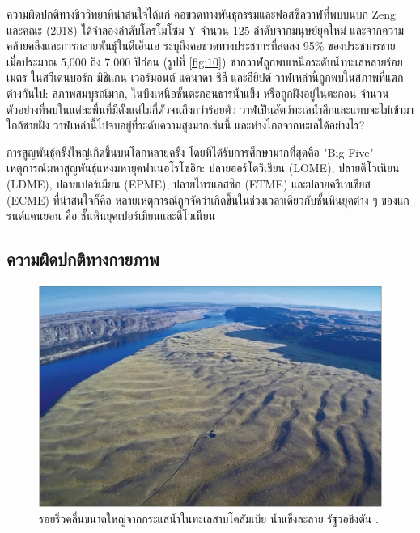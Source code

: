 \documentclass[10pt,twocolumn,letterpaper]{article}
\begin{document}
ความผิดปกติทางชีววิทยาที่น่าสนใจได้แก่ คอขวดทางพันธุกรรมและฟอสซิลวาฬที่พบบนบก Zeng และคณะ (2018) ได้จำลองลำดับโครโมโซม Y จำนวน 125 ลำดับจากมนุษย์ยุคใหม่ และจากความคล้ายคลึงและการกลายพันธุ์ในดีเอ็นเอ ระบุถึงคอขวดทางประชากรที่ลดลง 95\% ของประชากรชาย เมื่อประมาณ 5,000 ถึง 7,000 ปีก่อน (รูปที่ \ref{fig:10}) \cite{62} ซากวาฬถูกพบเหนือระดับน้ำทะเลหลายร้อยเมตร ในสวีเดนบอร์ก มิชิแกน เวอร์มอนต์ แคนาดา ชิลี และอียิปต์ \cite{63,64,65,66} วาฬเหล่านี้ถูกพบในสภาพที่แตกต่างกันไป: สภาพสมบูรณ์มาก, ในบึงเหนือชั้นตะกอนธารน้ำแข็ง หรือถูกฝังอยู่ในตะกอน จำนวนตัวอย่างที่พบในแต่ละพื้นที่มีตั้งแต่ไม่กี่ตัวจนถึงกว่าร้อยตัว วาฬเป็นสัตว์ทะเลน้ำลึกและแทบจะไม่เข้ามาใกล้ชายฝั่ง วาฬเหล่านี้ไปจบอยู่ที่ระดับความสูงมากเช่นนี้ และห่างไกลจากทะเลได้อย่างไร?

การสูญพันธุ์ครั้งใหญ่เกิดขึ้นบนโลกหลายครั้ง โดยที่ได้รับการศึกษามากที่สุดคือ "Big Five" เหตุการณ์มหาสูญพันธุ์แห่งมหายุคฟาเนอโรโซอิก: ปลายออร์โดวิเชียน (LOME), ปลายดีโวเนียน (LDME), ปลายเปอร์เมียน (EPME), ปลายไทรแอสซิก (ETME) และปลายครีเทเชียส (ECME) \cite{88,89} ที่น่าสนใจก็คือ หลายเหตุการณ์ถูกจัดว่าเกิดขึ้นในช่วงเวลาเดียวกับชั้นหินยุคต่าง ๆ ของแกรนด์แคนยอน คือ ชั้นหินยุคเปอร์เมียนและดีโวเนียน

\subsection{ความผิดปกติทางกายภาพ}

\begin{figure}[b]
\begin{center}
   \includegraphics[width=1\linewidth]{columbia.jpg}
\end{center}
   \caption{รอยริ้วคลื่นขนาดใหญ่จากกระแสน้ำในทะเลสาบโคลัมเบีย น้ำแข็งละลาย รัฐวอชิงตัน \cite{80}.}
\label{fig:11}
\label{fig:onecol}
\end{figure}
\end{document}
